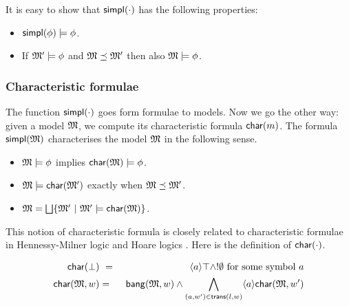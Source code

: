 \NI It is easy to show that $\mathsf{simpl}(\cdot)$ has the following properties:

\begin{itemize}

\item $\mathsf{simpl}(\phi) \models \phi$.

\item If $\frak{M}' \models \phi$ and  $\frak{M} \preceq \frak{M}'$ then also  $\frak{M} \models \phi$.
 
\end{itemize}

\subsubsection{Characteristic formulae}

The function $\mathsf{simpl}(\cdot)$ goes form formulae to models. Now we go
the other way: given a model $\frak{M}$, we compute its characteristic
formula $\mathsf{char}(m)$. The formula $\mathsf{simpl}(\frak{M})$ characterises the model
$\frak{M}$ in the following sense. 

\begin{itemize}

\item  $\frak{M} \models \phi$ implies $\mathsf{char}(\frak{M}) \models \phi$.

\item  $\frak{M} \models \mathsf{char}( \frak{M}' )$ exactly when $\frak{M} \preceq \frak{M}'$.

\item $\frak{M} = \bigsqcup \{\frak{M}' \ |\ \frak{M}' \models \mathsf{char}(\frak{M}) \}$.

\end{itemize}


\NI This notion of characteristic formula is closely related to
characteristic formulae in Hennessy-Milner logic
\cite{AcetoL:chaforfata} and Hoare logics
\cite{HondaK:descriptive,ChargueraudA:provertcf}. Here is the
definition of $\mathsf{char}(\cdot)$.

\begin{eqnarray*}
  \mathsf{char}(\bot) &\ =\ & \langle a \rangle \top \land ! \emptyset  \mbox{ for some symbol }a  \\
  \mathsf{char}(\frak{M}, w) & = & \mathsf{bang}(\frak{M},w) \land \bigwedge_{(a,w') \in \mathsf{trans}(l,w)} \langle a \rangle \mathsf{char}(\frak{M}, w')  
\end{eqnarray*}


